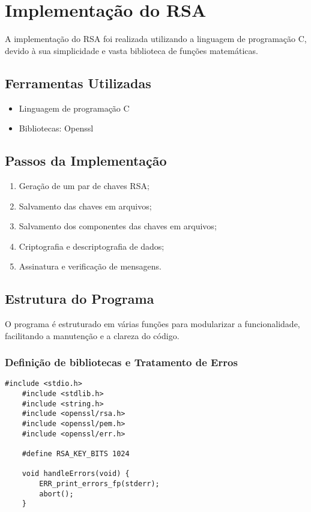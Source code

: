 \documentclass[a4paper,12pt]{article}
\begin{document}
\section*{Implementação do RSA}
A implementação do RSA foi realizada utilizando a linguagem de programação C, devido à sua simplicidade e vasta biblioteca de funções matemáticas.

\subsection*{Ferramentas Utilizadas}
\begin{itemize}
    \item Linguagem de programação C
    \item Bibliotecas: Openssl
\end{itemize}

\subsection*{Passos da Implementação}
\begin{enumerate}
    \item Geração de um par de chaves RSA;
    \item Salvamento das chaves em arquivos;
    \item Salvamento dos componentes das chaves em arquivos;
    \item Criptografia e descriptografia de dados;
    \item Assinatura e verificação de mensagens.
\end{enumerate}

\subsection*{Estrutura do Programa}
O programa é estruturado em várias funções para modularizar a funcionalidade, facilitando a manutenção e a clareza do código.

\subsubsection*{Definição de bibliotecas e Tratamento de Erros}
\begin{lstlisting}[style=CStyle]
    #include <stdio.h>
    #include <stdlib.h>
    #include <string.h>
    #include <openssl/rsa.h>
    #include <openssl/pem.h>
    #include <openssl/err.h>

    #define RSA_KEY_BITS 1024

    void handleErrors(void) {
        ERR_print_errors_fp(stderr);
        abort();
    }
\end{lstlisting}
\end{document}
